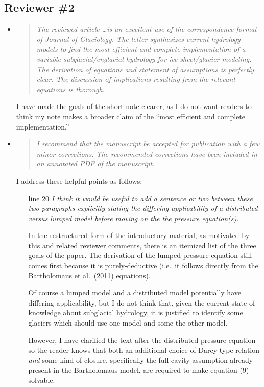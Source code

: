 \documentclass[11pt,reqno]{amsart}
\newcommand{\reply}[2]{
\medskip\medskip
\item  \begin{quote}
\emph{#1}
\end{quote}

\medskip
\noindent #2}
\begin{document}
\subsection*{Reviewer \#2}  \begin{itemize}
\reply{The reviewed article \dots is an excellent use of the correspondence format of Journal of Glaciology.  The letter synthesizes current hydrology models to find the most efficient and complete implementation of a variable subglacial/englacial hydrology for ice sheet/glacier modeling.  The derivation of equations and statement of assumptions is perfectly clear.  The discussion of implications resulting from the relevant equations is thorough.}
{I have made the goals of the short note clearer, as I do not want readers to think my note makes a broader claim of the ``most efficient and complete implementation.''}

\reply{I recommend that the manuscript be accepted for publication with a few minor corrections. The recommended corrections have been included in an annotated PDF of the manuscript.}
{I address these helpful points as follows:

\medskip
\begin{itemize}
\item[line 20] \emph{I think it would be useful to add a sentence or two between these two paragraphs explicitly stating the differing applicability of a distributed versus lumped model before moving on the the pressure equation(s).}

\quad In the restructured form of the introductory material, as motivated by this and related reviewer comments, there is an itemized list of the three goals of the paper.  The derivation of the lumped pressure equation still comes first because it is purely-deductive (i.e.~it follows directly from the Bartholomaus et al.~(2011) equations).

\quad Of course a lumped model and a distributed model potentially have differing applicability, but I do not think that, given the current state of knowledge about subglacial hydrology, it is justified to identify some glaciers which should use one model and some the other model.

\quad However, I have clarified the text after the distributed pressure equation so the reader knows that both an additional choice of Darcy-type relation \emph{and} some kind of closure, specifically the full-cavity assumption already present in the Bartholomaus model, are required to make equation (9) solvable.


\end{itemize}}
\end{itemize}
\end{document}
